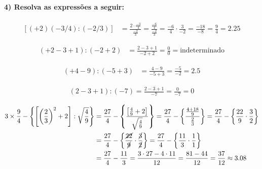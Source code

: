 \documentclass[pdftex, brazil, 12pt, oneside]{article}
\begin{document}
\paragraph{4) Resolva as expressões a seguir:}

\begin{equation}
  \begin{split}
    [(+2)(-3/4):(-2/3)] &= \frac{2 \cdot \frac{-3}{4}}{\frac{-2}{3}} = \frac{\frac{-6}{4}}{\frac{-2}{3}} = \frac{-6}{4} \cdot \frac{3}{-2}
    = \frac{-18}{-8} = \frac{9}{4} = 2.25
  \end{split}
\end{equation}

\begin{equation}
  \begin{split}
    (+2-3+1):(-2+2) &= \frac{2-3+1}{-2+2} = \frac{0}{0} = \text{indeterminado}
  \end{split}
\end{equation}

\begin{equation}
  \begin{split}
    (+4-9):(-5+3) &= \frac{4-9}{-5+3} = \frac{-5}{-2} = 2.5
  \end{split}
\end{equation}

\begin{equation}
  \begin{split}
    (2-3+1):(-7) = \frac{2-3+1}{-7} = \frac{0}{-7} = 0
  \end{split}
\end{equation}

\begin{equation}
  \begin{split}
    3 \times \frac{9}{4} - \left\{ \left[ \left(\frac{2}{3}\right)^2 + 2 \right]:\sqrt{\frac{4}{9}} \right\} &=
    \frac{27}{4} - \left\{ \frac{\left[ \frac{4}{9} + 2 \right]}{\sqrt{\frac{4}{9}}} \right\} = \frac{27}{4}-\left\{\frac{\frac{4 + 18}{9}}{\frac{2}{3}} \right\} = \frac{27}{4} - \left\{ \frac{22}{9} \cdot \frac{3}{2} \right\}\\
    &= \frac{27}{4} - \left\{ \frac{\cancel{22}}{\cancel{9}} \cdot \frac{\cancel{3}}{\cancel{2}} \right\} =
    \frac{27}{4} - \left\{ \frac{11}{3} \cdot \frac{1}{1} \right\}\\
    &= \frac{27}{4} - \frac{11}{3}  = \frac{3 \cdot 27 - 4 \cdot 11}{12} = \frac{81-44}{12} = \frac{37}{12} \approx 3.08
  \end{split}
\end{equation}
\end{document}
